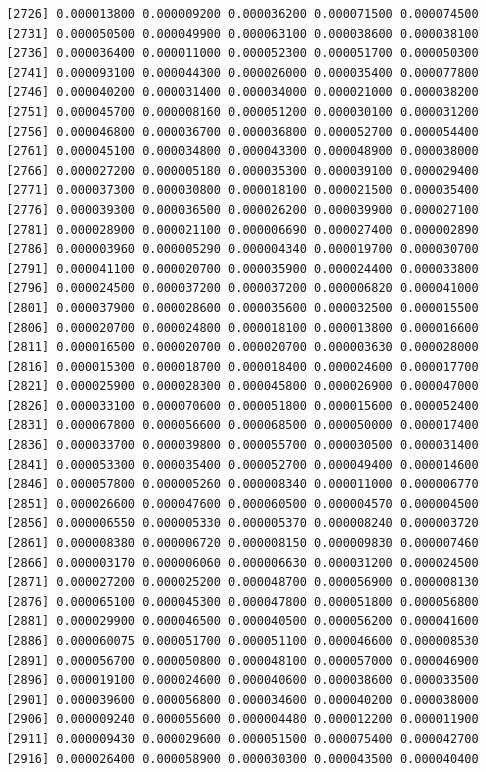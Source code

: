 \documentclass[]{article}
\begin{document}
\begin{verbatim}
 [2726] 0.000013800 0.000009200 0.000036200 0.000071500 0.000074500
 [2731] 0.000050500 0.000049900 0.000063100 0.000038600 0.000038100
 [2736] 0.000036400 0.000011000 0.000052300 0.000051700 0.000050300
 [2741] 0.000093100 0.000044300 0.000026000 0.000035400 0.000077800
 [2746] 0.000040200 0.000031400 0.000034000 0.000021000 0.000038200
 [2751] 0.000045700 0.000008160 0.000051200 0.000030100 0.000031200
 [2756] 0.000046800 0.000036700 0.000036800 0.000052700 0.000054400
 [2761] 0.000045100 0.000034800 0.000043300 0.000048900 0.000038000
 [2766] 0.000027200 0.000005180 0.000035300 0.000039100 0.000029400
 [2771] 0.000037300 0.000030800 0.000018100 0.000021500 0.000035400
 [2776] 0.000039300 0.000036500 0.000026200 0.000039900 0.000027100
 [2781] 0.000028900 0.000021100 0.000006690 0.000027400 0.000002890
 [2786] 0.000003960 0.000005290 0.000004340 0.000019700 0.000030700
 [2791] 0.000041100 0.000020700 0.000035900 0.000024400 0.000033800
 [2796] 0.000024500 0.000037200 0.000037200 0.000006820 0.000041000
 [2801] 0.000037900 0.000028600 0.000035600 0.000032500 0.000015500
 [2806] 0.000020700 0.000024800 0.000018100 0.000013800 0.000016600
 [2811] 0.000016500 0.000020700 0.000020700 0.000003630 0.000028000
 [2816] 0.000015300 0.000018700 0.000018400 0.000024600 0.000017700
 [2821] 0.000025900 0.000028300 0.000045800 0.000026900 0.000047000
 [2826] 0.000033100 0.000070600 0.000051800 0.000015600 0.000052400
 [2831] 0.000067800 0.000056600 0.000068500 0.000050000 0.000017400
 [2836] 0.000033700 0.000039800 0.000055700 0.000030500 0.000031400
 [2841] 0.000053300 0.000035400 0.000052700 0.000049400 0.000014600
 [2846] 0.000057800 0.000005260 0.000008340 0.000011000 0.000006770
 [2851] 0.000026600 0.000047600 0.000060500 0.000004570 0.000004500
 [2856] 0.000006550 0.000005330 0.000005370 0.000008240 0.000003720
 [2861] 0.000008380 0.000006720 0.000008150 0.000009830 0.000007460
 [2866] 0.000003170 0.000006060 0.000006630 0.000031200 0.000024500
 [2871] 0.000027200 0.000025200 0.000048700 0.000056900 0.000008130
 [2876] 0.000065100 0.000045300 0.000047800 0.000051800 0.000056800
 [2881] 0.000029900 0.000046500 0.000040500 0.000056200 0.000041600
 [2886] 0.000060075 0.000051700 0.000051100 0.000046600 0.000008530
 [2891] 0.000056700 0.000050800 0.000048100 0.000057000 0.000046900
 [2896] 0.000019100 0.000024600 0.000040600 0.000038600 0.000033500
 [2901] 0.000039600 0.000056800 0.000034600 0.000040200 0.000038000
 [2906] 0.000009240 0.000055600 0.000004480 0.000012200 0.000011900
 [2911] 0.000009430 0.000029600 0.000051500 0.000075400 0.000042700
 [2916] 0.000026400 0.000058900 0.000030300 0.000043500 0.000040400

\end{verbatim}
\end{document}
